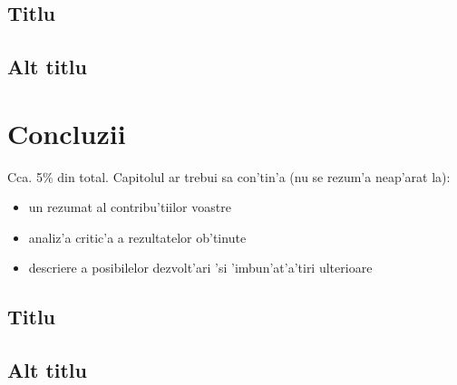 \documentclass[12pt,a4paper,twoside]{report}
\begin{document}
\section{Titlu}
\section{Alt titlu}

\chapter{Concluzii}

Cca. 5\% din total.
Capitolul ar trebui sa con'tin'a (nu se rezum'a neap'arat la):
\begin{itemize}
 \item un rezumat al contribu'tiilor voastre
\item analiz'a critic'a a rezultatelor ob'tinute
\item descriere a posibilelor dezvolt'ari 'si 'imbun'at'a'tiri ulterioare
\end{itemize}


\section{Titlu}
\section{Alt titlu}


 


\end{document}
